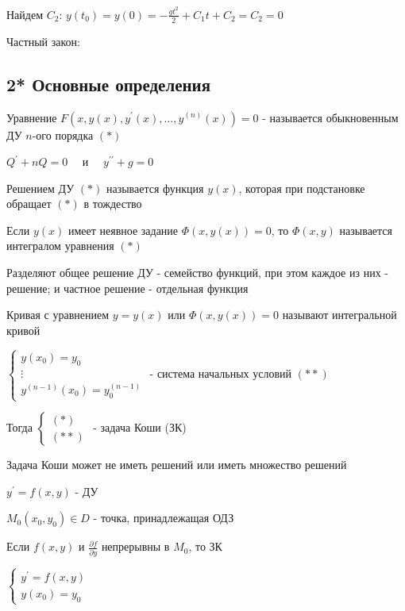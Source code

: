 \documentclass[12pt]{article}
\begin{document}
    Найдем $\displaystyle C_2$: $\displaystyle y(t_0) = y(0) = -\frac{gt^2}{2} + C_1 t + C_2 = C_2 = 0$

    Частный закон: 

    \vspace{5mm}

    \subsection{2* Основные определения}

     Уравнение $\displaystyle F(x, y(x), y^\prime(x), \dots, y^{(n)}(x)) = 0$ - называется обыкновенным ДУ $n$-ого порядка $(*)$

    \Ex $\displaystyle Q^\prime + nQ = 0 \quad$ и $\displaystyle \quad y^{\prime\prime} + g = 0$

     Решением ДУ $(*)$ называется функция $y(x)$, которая при подстановке обращает $(*)$ в тождество

     Если $y(x)$ имеет неявное задание $\Phi(x, y(x)) = 0$, то $\Phi(x, y)$ называется интегралом уравнения $(*)$

    \Nota Разделяют общее решение ДУ - семейство функций, при этом каждое из них - решение; и
    частное решение - отдельная функция

     Кривая с уравнением $y = y(x)$ или $\Phi(x, y(x)) = 0$ называют интегральной кривой

     $\displaystyle \begin{cases}y(x_0) = y_0 \\ \vdots \\ y^{(n - 1)}(x_0) = y_0^{(n - 1)}\end{cases}$ - система начальных условий $(**)$

    Тогда $\begin{cases}(*) \\ (**)\end{cases}$ - задача Коши (ЗК)

    \Nota Задача Коши может не иметь решений или иметь множество решений

    \Th $\displaystyle y^\prime = f(x, y)$ - ДУ

    $\displaystyle M_0(x_0, y_0) \in D$ - точка, принадлежащая ОДЗ

    Если $f(x, y)$ и $\displaystyle \frac{\partial f}{\partial y}$ непрерывны в $\displaystyle M_0$, то ЗК

    $\displaystyle \begin{cases}y^\prime = f(x, y) \\ y(x_0) = y_0\end{cases}$
\end{document}
